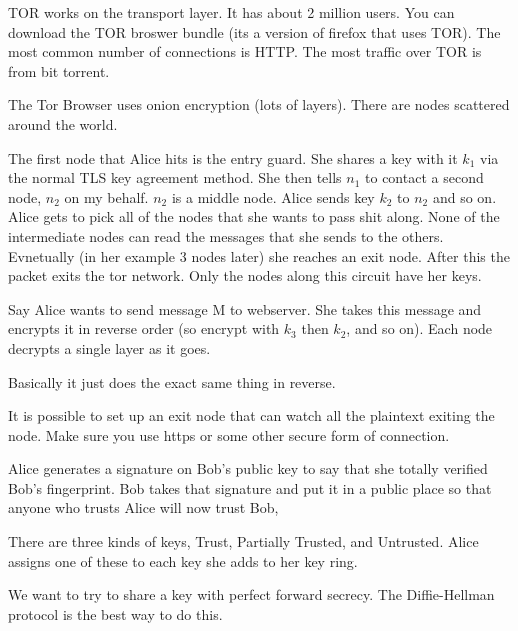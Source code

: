 \documentclass{article}
\begin{document}

TOR works on the transport layer. It has about 2 million users. You can download the TOR broswer bundle (its a version of firefox that uses TOR). The most common number of connections is HTTP. The most traffic over TOR is from bit torrent.



The Tor Browser uses onion encryption (lots of layers). There are nodes scattered around the world. 




The first node that Alice hits is the entry guard. She shares a key with it $k_1$ via the normal TLS key agreement method. She then tells $n_1$ to contact a second node, $n_2$ on my behalf. $n_2$ is a middle node. Alice sends key $k_2$ to $n_2$ and so on. Alice gets to pick all of the nodes that she wants to pass shit along. None of the intermediate nodes can read the messages that she sends to the others. Evnetually (in her example 3 nodes later) she reaches an exit node. After this the packet exits the tor network. Only the nodes along this circuit have her keys.


Say Alice wants to send message M to webserver. She takes this message and encrypts it in reverse order (so encrypt with $k_3$ then $k_2$, and so on). Each node decrypts a single layer as it goes.


Basically it just does the exact same thing in reverse.


It is possible to set up an exit node that can watch all the plaintext exiting the node. Make sure you use https or some other secure form of connection.









Alice generates a signature on Bob's public key to say that she totally verified Bob's fingerprint. Bob takes that signature and put it in a public place so that anyone who trusts Alice will now trust Bob,


There are three kinds of keys, Trust, Partially Trusted, and Untrusted. Alice assigns one of these to each key she adds to her key ring. 


We want to try to share a key with perfect forward secrecy. The Diffie-Hellman protocol is the best way to do this.
\end{document}
